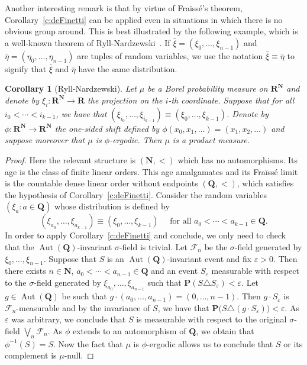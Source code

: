 \documentclass[11pt]{article}
\let\mathcal\mathscr
\let\eps\varepsilon
\let\sdiff\triangle
\theoremstyle{plain}
\newtheorem{cor}[theorem]{Corollary}
\theoremstyle{definition}
\newcommand{\N}{{\mathbf N}}
\newcommand{\Q}{{\mathbf Q}}
\newcommand{\R}{{\mathbf R}}
\newcommand{\bP}{{\mathbf P}}\let\Pr\bP
\newcommand{\cF}{\mathcal{F}}
\DeclareMathOperator{\Aut}{Aut}
\begin{document}
Another interesting remark is that by virtue of Fraïssé's theorem, Corollary~\ref{c:deFinetti} can be applied even in situations in which there is no obvious group around. This is best illustrated by the following example, which is a well-known theorem of Ryll-Nardzewski~\cite{RyllNardzewski1957}. If $\bar \xi = (\xi_0, \ldots, \xi_{n-1})$ and $\bar \eta = (\eta_0, \ldots, \eta_{n-1})$ are tuples of random variables, we use the notation $\bar \xi \equiv \bar \eta$ to signify that $\bar \xi$ and $\bar \eta$ have the same distribution.
\begin{cor}[Ryll-Nardzewski]
\label{c:RyllNardzewski}
Let $\mu$ be a Borel probability measure on $\R^\N$ and denote by $\xi_i \colon \R^\N \to \R$ the projection on the $i$-th coordinate. Suppose that for all $i_0 < \cdots < i_{k-1}$, we have that $(\xi_{i_0}, \ldots, \xi_{i_{k-1}}) \equiv (\xi_0, \ldots, \xi_{k-1})$. Denote by $\phi \colon \R^\N \to \R^\N$ the one-sided shift defined by $\phi(x_0, x_1, \ldots) = (x_1, x_2, \ldots)$ and suppose moreover that $\mu$ is $\phi$-ergodic. Then $\mu$ is a product measure.
\end{cor}
\begin{proof}
Here the relevant structure is $(\N, <)$ which has no automorphisms. Its age is the class of finite linear orders. This age amalgamates and its Fraïssé limit is the countable dense linear order without endpoints $(\Q, <)$, which satisfies the hypothesis of Corollary~\ref{c:deFinetti}. Consider the random variables $(\xi_a : a \in \Q)$ whose distribution is defined by
\begin{equation*}
(\xi_{a_0}, \ldots, \xi_{a_{k-1}}) \equiv (\xi_0, \ldots, \xi_{k-1}) \quad \text{ for all } a_0 < \cdots < a_{k-1} \in \Q.
\end{equation*}
In order to apply Corollary~\ref{c:deFinetti} and conclude, we only need to check that the $\Aut(\Q)$-invariant $\sigma$-field is trivial. Let $\cF_n$ be the $\sigma$-field generated by $\xi_0, \ldots, \xi_{n-1}$. Suppose that $S$ is an $\Aut(\Q)$-invariant event and fix $\eps > 0$. Then there exists $n \in \N$, $a_0 < \cdots < a_{n-1} \in \Q$ and an event $S_\eps$ measurable with respect to the $\sigma$-field generated by $\xi_{a_0}, \ldots, \xi_{a_{n-1}}$ such that $\bP(S \sdiff S_\eps) < \eps$. Let $g \in \Aut(\Q)$ be such that $g \cdot (a_0, \ldots, a_{n-1}) = (0, \ldots, n-1)$. Then $g \cdot S_\eps$ is $\cF_n$-measurable and by the invariance of $S$, we have that $\bP \big(S \sdiff (g \cdot S_\eps) \big) < \eps$. As $\eps$ was arbitrary, we conclude that $S$ is measurable with respect to the original $\sigma$-field $\bigvee_n \cF_n$. As $\phi$ extends to an automorphism of $\Q$, we obtain that $\phi^{-1}(S) = S$. Now the fact that $\mu$ is $\phi$-ergodic allows us to conclude that $S$ or its complement is $\mu$-null.
\end{proof}
\end{document}
